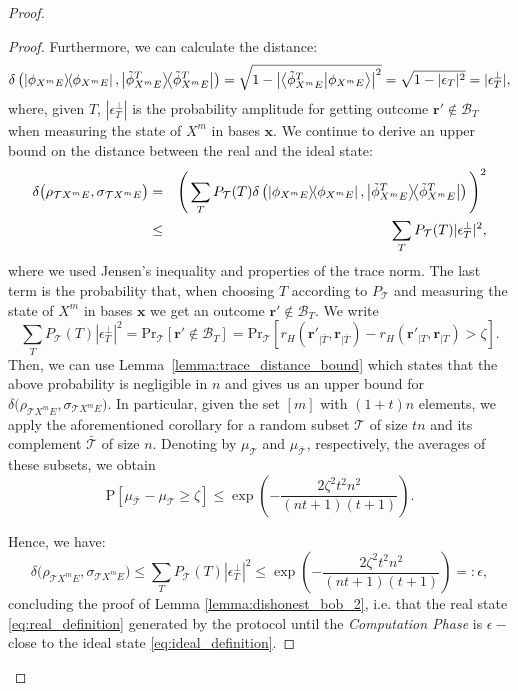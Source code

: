 \begin{proof}
\begin{proof}
Furthermore, we can calculate the distance:
\begin{equation*}
    \delta\left( \ketbra{\phi_{X^m E}}, \ketbra{\tilde{\phi}_{X^m E}^T} \right) = \sqrt{1 - \left|\braket{\tilde{\phi}_{X^m E}^T}{\phi_{X^m E}}\right|^2} 
=\sqrt{1 - |\epsilon_T|^2} 
= |\epsilon_T^\perp|,
\end{equation*}
 where,  given $T$,  $|\epsilon_T^\perp|$ is the probability amplitude for getting  outcome $\boldsymbol{r'} \notin \mathcal{B}_{T}$ when measuring the state of $X^m$ in bases $\boldsymbol{x}$.
We continue to derive an upper bound on the distance between the real and the ideal state: 
\begin{eqnarray*}
    \delta\big( \rho_{\mathcal{T}X^m E}, \sigma_{\mathcal{T}X^m E} \big) &=& \Bigg( \sum_T P_\mathcal{T}(T) \delta\left( \ketbra{\phi_{X^m E}}, \ketbra{\tilde{\phi}_{X^m E}^T} \right) \Bigg)^2\\
    & \leq &\sum_T P_\mathcal{T}(T) |\epsilon_T^\perp|^2, 
\end{eqnarray*}
where we used Jensen's inequality and properties of the trace norm. The last term is the probability that, when choosing $T$ according to $P_{\mathcal{T}}$ and measuring the state of $X^m$ in bases $\boldsymbol{x}$ we get an outcome  $\boldsymbol{r'} \notin \mathcal{B}_{T}$. We write  
\begin{equation*}
     \sum_T P_\mathcal{T}(T)|\epsilon_T^\perp|^2 = \text{Pr}_{\mathcal{T}}[\boldsymbol{r'} \notin \mathcal{B}_{T}] = \text{Pr}_{\mathcal{T}}[r_H(\boldsymbol{r'}_{|\bar{T}}, \boldsymbol{r}_{|\bar{T}}) - r_H(\boldsymbol{r'}_{|T}, \boldsymbol{r}_{|T}) > \zeta].
\end{equation*}
 Then, we can use Lemma~\ref{lemma:trace_distance_bound} which states that the above probability is negligible in $n$ and gives us an upper bound for $\delta\big( \rho_{\mathcal{T}X^m E}, \sigma_{\mathcal{T}X^m E} \big)$. In particular, given the set $[m]$ with $(1+t)n$ elements, we apply the aforementioned corollary for a random subset $\mathcal{T}$ of size $tn$ and its complement $\bar{\mathcal{T}}$ of size $n$. Denoting by $\mu_{\mathcal{T}}$ and $\mu_{\bar{\mathcal{T}}}$, respectively,  the averages of these subsets, we obtain
\begin{equation*}
\text{P}[\mu_{\bar{\mathcal{T}}} - \mu_{\mathcal{T}} \geq \zeta] \leq \exp( -\frac{2 \zeta^2t^2n^2}{(nt+1)(t+1)}).
    \end{equation*}

Hence, we have:
\begin{equation}
    \delta\big( \rho_{\mathcal{T}X^m E}, \sigma_{\mathcal{T}X^m E} \big) \leq  \sum_T P_\mathcal{T}(T)|\epsilon_T^\perp|^2 \leq \exp( -\frac{2 \zeta^2t^2n^2}{(nt+1)(t+1)})=: \epsilon,
\end{equation}
concluding the proof of Lemma \ref{lemma:dishonest_bob_2}, i.e. that the real state \eqref{eq:real_definition} generated by the protocol until the \textit{Computation Phase}  is  $\epsilon-$close to the ideal state \eqref{eq:ideal_definition}.
\end{proof}


\end{proof}
